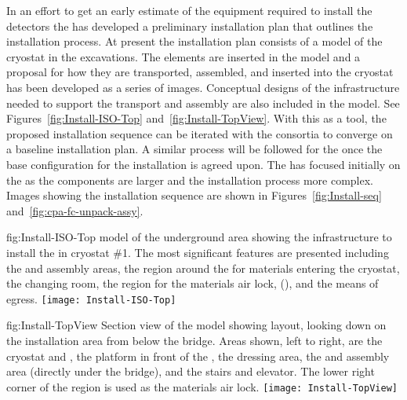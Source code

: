 In an effort to get an early estimate of the equipment required to
install the detectors the  has developed a preliminary
installation plan that outlines the installation process. At present
the installation plan consists of a \threed model of the cryostat in the
excavations. The  elements are inserted in the
model and a proposal for how they are transported, assembled, and
inserted into the cryostat has been developed as a series of images. %
%
Conceptual designs of the infrastructure needed to support
the transport and assembly are also included in the model. See Figures~\ref{fig:Install-ISO-Top} and~\ref{fig:Install-TopView}. With this
as a tool, the proposed installation sequence can be iterated with the
consortia to converge on a baseline installation plan. A similar
process will be followed for the  once the base
configuration for the  installation is agreed upon. The
 has focused initially on the  as the
 components are larger and the installation process more
complex. Images showing the  installation sequence are shown
in Figures~\ref{fig:Install-seq} and~\ref{fig:cpa-fc-unpack-assy}.

\begin{dunefigure}{fig:Install-ISO-Top}
  {\threed model of the underground area showing the infrastructure to install the  in cryostat \#1. The most significant features are presented including the  and  assembly areas, the region around the  for materials entering the cryostat,  the changing room, the region for the materials air lock, (), 
  and the means of egress.}
\texttt{[image: Install-ISO-Top]}
\end{dunefigure}

\begin{dunefigure}{fig:Install-TopView}
  {Section view of the \threed model showing layout, looking down on the installation area from below the bridge. Areas shown, left to right,  are the cryostat and , the platform in front of the , the dressing area, the  and  assembly area (directly under the bridge), and the stairs and elevator. The lower right corner of the region is used as the materials air lock.}
\texttt{[image: Install-TopView]}
\end{dunefigure}

